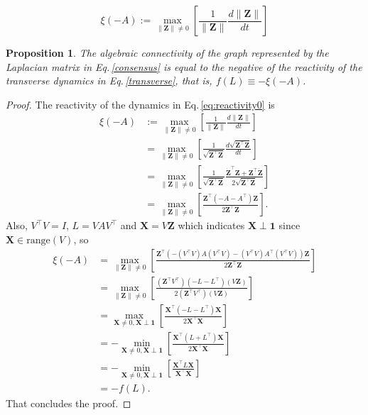 \documentclass[10pt,a4paper]{amsart}
\newtheorem{proposition}{Proposition}
\def \bX {\pmb{X}}
\def \bZ {\pmb{Z}}
\def \bone {\pmb{1}}
\begin{document}
\begin{equation} \label{eq:reactivity0}
    \xi\left( -A \right) :=  \max_{\|  \bZ\| \neq 0} \left[ \frac{1}{\|  \bZ \|} \frac{d \|  \bZ\|}{d t} \right]
\end{equation}

\begin{proposition}
    The algebraic connectivity of the graph represented by the Laplacian matrix in Eq.\,\eqref{consensus} is equal to the negative of the reactivity of the transverse dynamics in Eq.\,\eqref{transverse}, that is, $f(L) \equiv - \xi(-A)$.
\end{proposition}

\begin{proof}
    The reactivity of the dynamics in Eq.\,\eqref{eq:reactivity0} is
    \begin{align*}
        \xi\left( -A \right) & :=  \max_{\|  \bZ\| \neq 0} \left[ \frac{1}{\|  \bZ \|} \frac{d \|  \bZ\|}{d t} \right] \\
        & = \max_{\|  \bZ\| \neq 0} \left[ \frac{1}{\sqrt{\bZ^\top \bZ}} \frac{d \sqrt{\bZ^\top \bZ}}{d t} \right] \\
        & = \max_{\|  \bZ\| \neq 0} \left[ \frac{1}{\sqrt{\bZ^\top \bZ}} \frac{\dot{\bZ}^\top \bZ + \bZ^\top \dot{\bZ}}{2\sqrt{\bZ^\top \bZ}} \right] \\
        & = \max_{\|  \bZ\| \neq 0} \left[ \frac{\bZ^\top (-A - A^\top) \bZ}{2 \bZ^\top \bZ} \right].
    \end{align*}
    Also, $V^\top V = I$, $L = V A V^\top$ and $\bX = V \bZ$ which indicates $\bX \perp \bone$ since $\bX \in \text{range}(V)$, so
    {\footnotesize
    \begin{align*}
        \xi\left( -A \right) & = \max_{\|  \bZ\| \neq 0} \left[ \frac{\bZ^\top  \left(-(V^\top V) A (V^\top V) - (V^\top V) A^\top (V^\top V)\right) \bZ}{2 \bZ^\top \bZ} \right] \\
        & = \max_{\|  \bZ\| \neq 0} \left[ \frac{(\bZ^\top V^\top)  (- L - L^\top) (V\bZ)}{2 (\bZ^\top V^\top) (V\bZ)} \right] \\
        & = \max_{ \bX \neq 0, \bX \perp \bone} \left[ \frac{\bX^\top  (- L - L^\top) \bX}{2 \bX^\top \bX} \right] \\
        & = -\min_{ \bX \neq 0, \bX \perp \bone} \left[ \frac{\bX^\top  ( L + L^\top) \bX}{2 \bX^\top \bX} \right] \\
        & = -\min_{ \bX \neq 0, \bX \perp \bone} \left[ \frac{\bX^\top  L \bX}{\bX^\top \bX} \right] \\
        & = -f (L).
    \end{align*}}
    That concludes the proof.
\end{proof}
\end{document}

